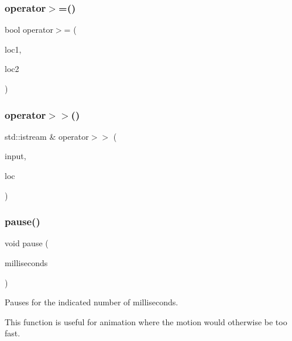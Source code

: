 \subsubsection{\texorpdfstring{operator$>$=()}{operator>=()}\hspace{0.1cm}{\footnotesize\ttfamily [4/4]}}
{\footnotesize\ttfamily bool operator$>$= (\begin{DoxyParamCaption}\item[{const \mbox{\hyperlink{structsgl_1_1GTableIndex}{G\+Table\+Index}} \&}]{loc1,  }\item[{const \mbox{\hyperlink{structsgl_1_1GTableIndex}{G\+Table\+Index}} \&}]{loc2 }\end{DoxyParamCaption})}

\mbox{\label{namespacesgl_a4645bbee5c37b00afdd2c78bc0d010ff}} 
\subsubsection{\texorpdfstring{operator$>$$>$()}{operator>>()}}
{\footnotesize\ttfamily std\+::istream \& operator$>$$>$ (\begin{DoxyParamCaption}\item[{std\+::istream \&}]{input,  }\item[{\mbox{\hyperlink{structsgl_1_1GTableIndex}{G\+Table\+Index}} \&}]{loc }\end{DoxyParamCaption})}

\mbox{\label{namespacesgl_a171d481a1b435b981f1bc7ad03ae4980}} 
\subsubsection{\texorpdfstring{pause()}{pause()}}
{\footnotesize\ttfamily void pause (\begin{DoxyParamCaption}\item[{double}]{milliseconds }\end{DoxyParamCaption})}



Pauses for the indicated number of milliseconds. 

This function is useful for animation where the motion would otherwise be too fast. \mbox{\label{namespacesgl_a25ce060b47ba94ee61147714f19c1764}} 
